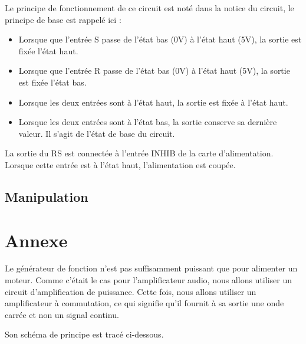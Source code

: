 \documentclass{../template/labo}
\begin{document}
Le principe de fonctionnement de ce circuit est noté dans la notice du circuit, le principe de base est
rappelé ici :

\begin{itemize}
    \item Lorsque que l'entrée S passe de l'état bas (0V) à l'état haut (5V), la sortie est fixée l'état haut.
    \item Lorsque que l'entrée R passe de l'état bas (0V) à l'état haut (5V), la sortie est fixée l'état bas.
    \item Lorsque les deux entrées sont à l'état haut, la sortie est fixée à l'état haut.
    \item Lorsque les deux entrées sont à l'état bas, la sortie conserve sa dernière valeur. Il s'agit de l'état de base du circuit.
\end{itemize}

La sortie du RS est connectée à l'entrée INHIB de la carte d'alimentation. Lorsque cette entrée est à
l'état haut, l'alimentation est coupée.

\subsection{Manipulation}






\section{Annexe}
Le générateur de fonction n'est pas suffisamment puissant que pour alimenter un moteur. Comme c'était le cas
pour l'amplificateur audio, nous allons utiliser un circuit d'amplification de puissance.
Cette fois, nous allons utiliser un amplificateur à commutation, ce qui signifie qu'il fournit à sa sortie une onde
carrée et non un signal continu.


Son schéma de principe est tracé ci-dessous.
\end{document}
